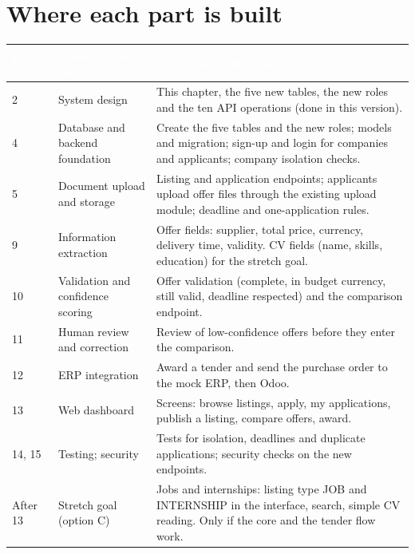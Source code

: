 \documentclass[11pt,a4paper]{report}
\newcommand{\hdr}[1]{\textcolor{white}{\sffamily\bfseries #1}}
\newcommand{\tblstart}{\rowcolors{2}{white}{rowgray}\arrayrulecolor{teal!60}}
\newcommand{\hdrrow}{\rowcolor{navy}}
\begin{document}
\section{Where each part is built}\label{sec:p2tenderphases}
{\tblstart\small
\begin{longtable}{L{1.6cm}L{4.4cm}L{7.8cm}}
\hdrrow \hdr{Phase} & \hdr{Name in the plan} & \hdr{Tender and opportunities work}\\  & System design & This chapter, the five new tables, the new roles and the ten API operations (done in this version).\\
4 & Database and backend foundation & Create the five tables and the new roles; models and migration; sign-up and login for companies and applicants; company isolation checks.\\
5 & Document upload and storage & Listing and application endpoints; applicants upload offer files through the existing upload module; deadline and one-application rules.\\
9 & Information extraction & Offer fields: supplier, total price, currency, delivery time, validity. CV fields (name, skills, education) for the stretch goal.\\
10 & Validation and confidence scoring & Offer validation (complete, in budget currency, still valid, deadline respected) and the comparison endpoint.\\
11 & Human review and correction & Review of low-confidence offers before they enter the comparison.\\
12 & ERP integration & Award a tender and send the purchase order to the mock ERP, then Odoo.\\
13 & Web dashboard & Screens: browse listings, apply, my applications, publish a listing, compare offers, award.\\
14, 15 & Testing; security & Tests for isolation, deadlines and duplicate applications; security checks on the new endpoints.\\
After 13 & Stretch goal (option C) & Jobs and internships: listing type JOB and INTERNSHIP in the interface, search, simple CV reading. Only if the core and the tender flow work.\\
\hline
\end{longtable}}
\end{document}
